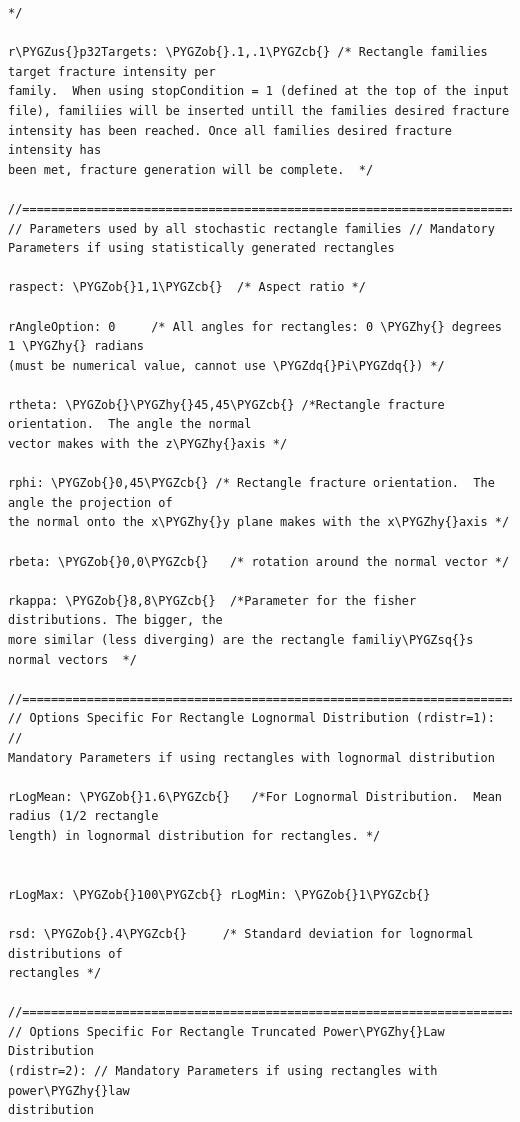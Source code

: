 \documentclass[letterpaper,10pt,english]{sphinxmanual}
\def\PYGZus{\char`\_}
\def\PYGZob{\char`\{}
\def\PYGZcb{\char`\}}
\def\PYGZhy{\char`\-}
\def\PYGZsq{\char`\'}
\def\PYGZdq{\char`\"}
\renewcommand\PYGZsq{\textquotesingle}
\begin{document}
\begin{Verbatim}[commandchars=\\\{\}]
                */

r\PYGZus{}p32Targets: \PYGZob{}.1,.1\PYGZcb{} /* Rectangle families target fracture intensity per
family.  When using stopCondition = 1 (defined at the top of the input
file), familiies will be inserted untill the families desired fracture
intensity has been reached. Once all families desired fracture intensity has
been met, fracture generation will be complete.  */

//============================================================================
// Parameters used by all stochastic rectangle families // Mandatory
Parameters if using statistically generated rectangles

raspect: \PYGZob{}1,1\PYGZcb{}  /* Aspect ratio */

rAngleOption: 0     /* All angles for rectangles: 0 \PYGZhy{} degrees 1 \PYGZhy{} radians
(must be numerical value, cannot use \PYGZdq{}Pi\PYGZdq{}) */

rtheta: \PYGZob{}\PYGZhy{}45,45\PYGZcb{} /*Rectangle fracture orientation.  The angle the normal
vector makes with the z\PYGZhy{}axis */

rphi: \PYGZob{}0,45\PYGZcb{} /* Rectangle fracture orientation.  The angle the projection of
the normal onto the x\PYGZhy{}y plane makes with the x\PYGZhy{}axis */

rbeta: \PYGZob{}0,0\PYGZcb{}   /* rotation around the normal vector */

rkappa: \PYGZob{}8,8\PYGZcb{}  /*Parameter for the fisher distributions. The bigger, the
more similar (less diverging) are the rectangle familiy\PYGZsq{}s normal vectors  */

//=============================================================================
// Options Specific For Rectangle Lognormal Distribution (rdistr=1): //
Mandatory Parameters if using rectangles with lognormal distribution

rLogMean: \PYGZob{}1.6\PYGZcb{}   /*For Lognormal Distribution.  Mean radius (1/2 rectangle
length) in lognormal distribution for rectangles. */


rLogMax: \PYGZob{}100\PYGZcb{} rLogMin: \PYGZob{}1\PYGZcb{}

rsd: \PYGZob{}.4\PYGZcb{}     /* Standard deviation for lognormal distributions of
rectangles */

//=============================================================================
// Options Specific For Rectangle Truncated Power\PYGZhy{}Law Distribution
(rdistr=2): // Mandatory Parameters if using rectangles with power\PYGZhy{}law
distribution


\end{Verbatim}
\end{document}
